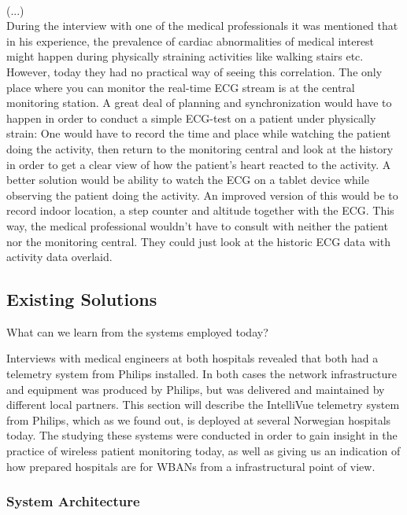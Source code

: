 \\
\newline
(...)
\\
\newline
During the interview with one of the medical professionals it was mentioned that in his experience, the prevalence of cardiac abnormalities of medical interest might happen during physically straining activities like walking stairs etc. However, today they had no practical way of seeing this correlation. The only place where you can monitor the real-time ECG stream is at the central monitoring station. A great deal of planning and synchronization would have to happen in order to conduct a simple ECG-test on a patient under physically strain: One would have to record the time and place while watching the patient doing the activity, then return to the monitoring central and look at the history in order to get a clear view of how the patient's heart reacted to the activity. A better solution would be ability to watch the ECG on a tablet device while observing the patient doing the activity. An improved version of this would be to record indoor location, a step counter and altitude together with the ECG. This way, the medical professional wouldn't have to consult with neither the patient nor the monitoring central. They could just look at the historic ECG data with activity data overlaid.


\subsection{Existing Solutions} %
\label{sub:existing_solutions}

What can we learn from the systems employed today?

Interviews with medical engineers at both hospitals revealed that both had a telemetry system from Philips installed. In both cases the network infrastructure and equipment was produced by Philips, but was delivered and maintained by different local partners. This section will describe the IntelliVue telemetry system from Philips, which as we found out, is deployed at several Norwegian hospitals today. The studying these systems were conducted in order to gain insight in the practice of wireless patient monitoring today, as well as giving us an indication of how prepared hospitals are for WBANs from a infrastructural point of view.

\subsubsection{System Architecture} %
\label{ssub:system_architecture}

